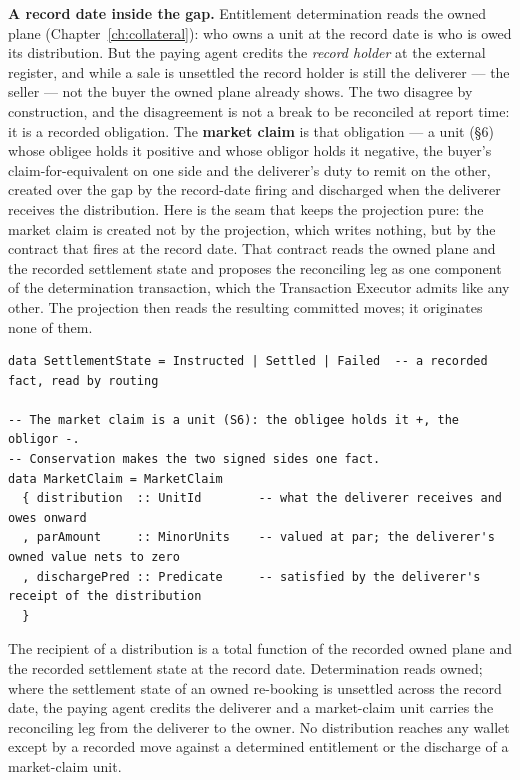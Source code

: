 \medskip\noindent\textbf{A record date inside the gap.} Entitlement determination
reads the owned plane (Chapter~\ref{ch:collateral}): who owns a unit at the record
date is who is owed its distribution. But the paying agent credits the \emph{record
holder} at the external register, and while a sale is unsettled the record holder is
still the deliverer --- the seller --- not the buyer the owned plane already shows.
The two disagree by construction, and the disagreement is not a break to be
reconciled at report time: it is a recorded obligation. The \textbf{market claim} is
that obligation --- a unit (\S6) whose obligee holds it positive and whose obligor
holds it negative, the buyer's claim-for-equivalent on one side and the deliverer's
duty to remit on the other, created over the gap by the record-date firing and
discharged when the deliverer receives the distribution. Here is the seam that keeps
the projection pure: the market claim is created not by the projection, which writes
nothing, but by the contract that fires at the record date. That contract reads the
owned plane and the recorded settlement state and proposes the reconciling leg as
one component of the determination transaction, which the Transaction Executor
admits like any other. The projection then reads the resulting committed moves; it
originates none of them.

\begin{lstlisting}
data SettlementState = Instructed | Settled | Failed  -- a recorded fact, read by routing

-- The market claim is a unit (S6): the obligee holds it +, the obligor -.
-- Conservation makes the two signed sides one fact.
data MarketClaim = MarketClaim
  { distribution  :: UnitId        -- what the deliverer receives and owes onward
  , parAmount     :: MinorUnits    -- valued at par; the deliverer's owned value nets to zero
  , dischargePred :: Predicate     -- satisfied by the deliverer's receipt of the distribution
  }
\end{lstlisting}

\begin{proposition}
The recipient of a distribution is a total function of the recorded owned plane and
the recorded settlement state at the record date. Determination reads owned; where
the settlement state of an owned re-booking is unsettled across the record date, the
paying agent credits the deliverer and a market-claim unit carries the reconciling
leg from the deliverer to the owner. No distribution reaches any wallet except by a
recorded move against a determined entitlement or the discharge of a market-claim
unit.
\end{proposition}

